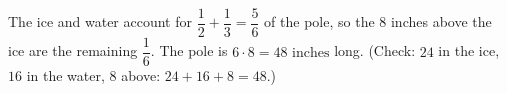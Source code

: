 The ice and water account for $\dfrac{1}{2}+\dfrac{1}{3}=\dfrac{5}{6}$ of the pole, so the $8$ inches above the ice are the remaining $\dfrac{1}{6}$. The pole is $6\cdot8=\boxed{48\text{ inches}}$ long. (Check: $24$ in the ice, $16$ in the water, $8$ above: $24+16+8=48$.)
